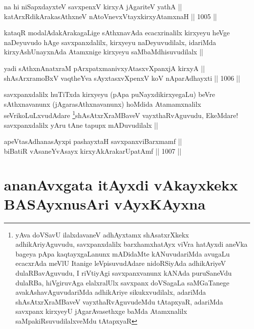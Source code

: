 
\begin{shl}
na hi niSapxdayxteV savxpenxV kirxyA jAgariteV yathA || \\
katArxRdikArakasAthxneV nAtoV\s nevxVtayxkirxyAtamxnaH ||  1005 ||  
\end{shl}

\begin{artha}
kataqR modalAdakArakagaLige sAthxnavAda ecacxrinalilx kirxyeyu heVge naDeyuvudo hAge savxpanxdalilx, kirxyeyu naDeyuvudilalx, idariMda kirxyAshUnayxnAda Atamxnige kirxyeyu saMbaMdhisuvudilalx ||
\end{artha}

\begin{shl}
yadi sAthxnAnatxraM pArxpatxmanivxyAtasxvXpanxjA kirxyA || \\
shAsArxramoBxV vaqtheYva sAyxtasxvXpenxV koV nAparAdhayxti ||  1006 ||  
\end{shl}

\begin{artha}
savxpanxdalilx huTiTxda kirxyeyu (pApa puNayxdikirxyegaLu) beVre sAthxnavanunx (jAgarasAthxnavanunx) hoMdida Atamamxnalilx seVrikoLuLxvudAdare \footnote{yAva doVSavU ilalxdavaneV adhAyxtamx shAsatxrXkekx adhikAriyAguvudu, savxpanxdalilx barxhamxhatAyx viVra hatAyxdi aneVka bageya pApa kaqtayxgaLanunx mADidaMte kANuvudariMda avugaLu ecacxrAda meVlU Itanige leVpisuvudAdare nidoRSiyAda adhikAriyeV dulaRBavAguvudu, I riVtiyAgi savxpanxvanunx kANAda puruSaneVdu dulaRBa, hiVgiruvAga elalxralUlx savxpanx doVSagaLa saMGaTanege avakAshavAguvudariMda adhikAriye sikukxvudilalx, adariMda shAsAtxrXraMBaveV vayxthaRvAguvudeMdu tAtapxyaR, adariMda savxpanx kirxyeyU jAgarAvasethxge baMda Atamxnalilx saMpakiRsuvudilalxveMdu tAtapxyaR}shAsAtxrXraMBaveV vayxthaRvAguvudu, EkeMdare! savxpanxdalilx yAru tAne tapupx mADuvudilalx ||
\end{artha}


\begin{shl}
apeVtasAdhanasAyxpi pashayxtaH savxpanxviBarxmamf || \\
biBatiR vAsaneYvAsayx kirxyAkArakarUpatAmf ||  1007 ||  
\end{shl}

\section*{ananAvxgata itAyxdi vAkayxkekx BASAyxnusAri vAyxKAyxna}

